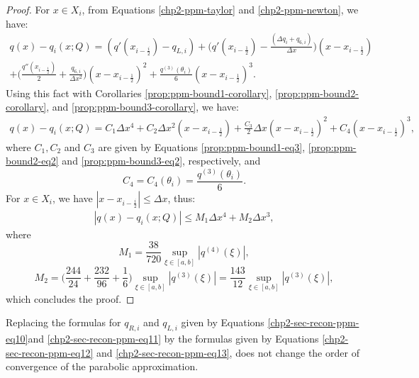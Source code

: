 \begin{proof}
For $x \in X_i$, from Equations \eqref{chp2-ppm-taylor} and \eqref{chp2-ppm-newton}, we have:
\begin{equation*}
	\begin{split}
	q(x)-q_i(x;Q) = (q'(x_{i-\frac{i}{2}})-q_{L,i})	
	+ \bigg(q'(x_{i-\frac{1}{2}})-  \frac{(\Delta q_i + q_{6, i})}{\Delta x}\bigg)(x-x_{i-\frac{1}{2}})
	\\+ \bigg(\frac{q''(x_{i-\frac{1}{2}})}{2} + \frac{q_{6, i}}{\Delta x^2}\bigg)(x-x_{i-\frac{1}{2}})^2
	+ \frac{q^{(3)}(\theta_i)}{6}(x-x_{i-\frac{1}{2}})^3.
	\end{split}
\end{equation*}
Using this fact with Corollaries \ref{prop:ppm-bound1-corollary}, \ref{prop:ppm-bound2-corollary},
and  \ref{prop:ppm-bound3-corollary}, we have:
\begin{equation*}
	\begin{split}
	q(x)-q_i(x;Q) =  C_1 \Delta x ^4 + C_2 \Delta x ^2(x-x_{i-\frac{1}{2}})
	+ \frac{C_3}{2} \Delta x (x-x_{i-\frac{1}{2}})^2
	+ C_4(x-x_{i-\frac{1}{2}})^3,
	\end{split}
\end{equation*}
where $C_1, C_2$ and $C_3$ are given by Equations \eqref{prop:ppm-bound1-eq3},
\eqref{prop:ppm-bound2-eq2} and \eqref{prop:ppm-bound3-eq2}, respectively, and
\begin{equation}
	\label{prop:ppm-bound4-eq3}
	C_4 = C_4(\theta_i) = \frac{q^{(3)}(\theta_i)}{6}.
\end{equation}
For $x\in X_i$, we have $|x -x_{i-\frac{i}{2}}| \leq \Delta x$, thus:
\begin{equation*}
	\begin{split}
		|q(x)-q_i(x;Q)| \leq  M_1 \Delta x ^4 + M_2 \Delta x ^3,
	\end{split}
\end{equation*}
where 
\begin{equation*}
M_1 = \frac{38}{720}\sup_{\xi \in [a,b]} |q^{(4)}(\xi)|, 
\end{equation*}
\begin{equation*}
M_2 = \bigg(\frac{244}{24} + \frac{232}{96} + \frac{1}{6} \bigg)
\sup_{\xi \in [a,b]} |q^{(3)}(\xi)| = \frac{143}{12} \sup_{\xi \in [a,b]} |q^{(3)}(\xi)|,
\end{equation*}
which concludes the proof.
\end{proof}

\begin{remark}
	Replacing the formulas for $q_{R,i}$ and $q_{L,i}$ given by Equations
	\eqref{chp2-sec-recon-ppm-eq10}and \eqref{chp2-sec-recon-ppm-eq11}
	by the formulas given by Equations \eqref{chp2-sec-recon-ppm-eq12}
	and \eqref{chp2-sec-recon-ppm-eq13}, does not change the order of convergence
	of the parabolic approximation.
\end{remark}

